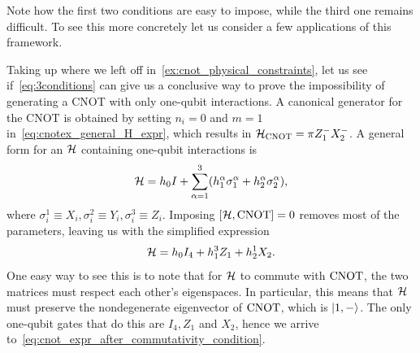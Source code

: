 Note how the first two conditions are easy to impose, while the third one remains difficult. To see this more concretely let us consider a few applications of this framework.

\begin{example}[label={ex:cnot_with_conditions}]
Taking up where we left off in~\cref{ex:cnot_physical_constraints}, let us see if~\cref{eq:3conditions} can give us a conclusive way to prove the impossibility of generating a CNOT with only one-qubit interactions.
A canonical generator for the CNOT is obtained by setting $n_i=0$ and $m=1$ in~\cref{eq:cnotex_general_H_expr}, which results in
$\mathcal{H}_{\operatorname{CNOT}}=\pi Z_1^- X_2^-$.
A general form for an $\mathcal{H}$ containing one-qubit interactions is
\begin{equation}
    \mathcal{H} = h_0 I +
    \sum_{\alpha=1}^3 (h_1^\alpha\sigma_1^\alpha + h_2^\alpha\sigma_2^\alpha),
\end{equation}
where $\sigma_i^1\equiv X_i, \sigma_i^2\equiv Y_i, \sigma_i^3\equiv Z_i$.
Imposing $[\mathcal{H},\operatorname{CNOT}]=0$ removes most of the parameters, leaving us with the simplified expression
\begin{equation}
    \mathcal{H} = h_0 I_4 + h_1^3 Z_1 + h_2^1 X_2.
    \label{eq:cnot_expr_after_commutativity_condition}
\end{equation}
One easy way to see this is to note that for $\mathcal{H}$ to commute with $\operatorname{CNOT}$, the two matrices must respect each other's eigenspaces. In particular, this means that $\mathcal{H}$ must preserve the nondegenerate eigenvector of $\operatorname{CNOT}$, which is $\ket{1,-}$.
The only one-qubit gates that do this are $I_4, Z_1$ and $X_2$, hence we arrive to~\cref{eq:cnot_expr_after_commutativity_condition}.


\end{example}
